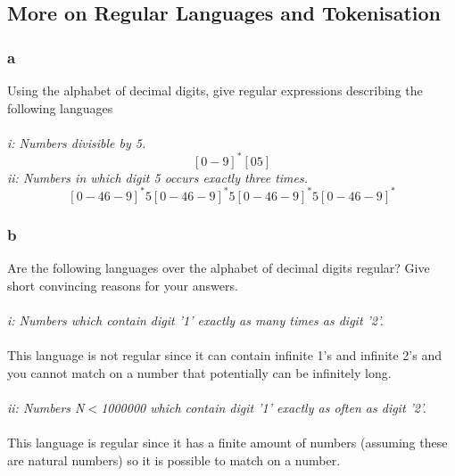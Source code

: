 \documentclass[12pt]{article}
\begin{document}
\subsection*{More on Regular Languages and Tokenisation}
\subsubsection*{a}
Using the alphabet of decimal digits, give regular expressions describing the following languages\\
\\
\textit{i: Numbers divisible by 5.}\\
$$[0-9]^*[05]$$
\textit{ii: Numbers in which digit 5 occurs exactly three times.}
$$[0-46-9]^*5[0-46-9]^*5[0-46-9]^*5[0-46-9]^*$$
\subsubsection*{b}
Are the following languages over the alphabet of decimal digits regular? Give short convincing reasons for your answers.\\
\\
\textit{i: Numbers which contain digit '1' exactly as many times as digit '2'.}\\
\\
This language is not regular since it can contain infinite 1's and infinite 2's and you cannot match on a number that potentially can be infinitely long.\\
\\
\textit{ii: Numbers N$<$1000000 which contain digit '1' exactly as often as digit '2'.}\\
\\
This language is regular since it has a finite amount of numbers (assuming these are natural numbers) so it is possible to match on a number.
\end{document}
